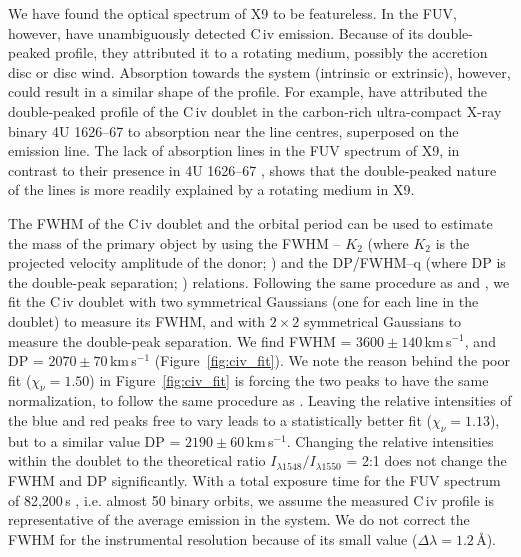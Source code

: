 \documentclass[a4paper,fleqn,usenatbib]{mnras}
\begin{document}
We have found the optical spectrum of X9 to be featureless. In the FUV, however, \citet{2008ApJ...683.1006K} have unambiguously detected C\,{\sc iv} emission. Because of its double-peaked profile, they attributed it to a rotating medium, possibly the accretion disc or disc wind. Absorption towards the system (intrinsic or extrinsic), however, could result in a similar shape of the profile. For example, \citet{2002AJ....124.3348H} have attributed the double-peaked profile of the C\,{\sc iv} doublet in the carbon-rich ultra-compact X-ray binary 4U 1626--67 to absorption near the line centres, superposed on the emission line. The lack of absorption lines in the FUV spectrum of X9, in contrast to their presence in 4U 1626--67 \citep{2002AJ....124.3348H}, shows that the double-peaked nature of the lines is more readily explained by a rotating medium in X9.

The FWHM of the C\,{\sc iv} doublet and the orbital period can be used to estimate the mass of the primary object by using the FWHM -- $K_2$ (where $K_2$ is the projected velocity amplitude of the donor; \citealp{2015ApJ...808...80C}) and the DP/FWHM--q (where DP is the double-peak separation; \citealp{2016ApJ...822...99C}) relations. Following the same procedure as \citet{2015ApJ...808...80C} and \citet{2016ApJ...822...99C}, we fit the C\,{\sc iv} doublet with two symmetrical Gaussians (one for each line in the doublet) to measure its FWHM, and with $2 \times 2$ symmetrical Gaussians to measure the double-peak separation. We find FWHM = $3600 \pm 140$\,km\,s$^{-1}$, and DP = $2070\pm70$\,km\,s$^{-1}$ (Figure~\ref{fig:civ_fit}). We note the reason behind the poor fit ($\chi_\nu = 1.50$) in Figure~\ref{fig:civ_fit} is forcing the two peaks to have the same normalization, to follow the same procedure as \citet{2016ApJ...822...99C}. Leaving the relative intensities of the blue and red peaks free to vary leads to a statistically better fit ($\chi_\nu = 1.13$), but to a similar value DP = $2190 \pm 60$\,km\,s$^{-1}$. Changing the relative intensities within the doublet to the theoretical ratio $I_{\lambda 1548} / I_{\lambda 1550}$ = 2:1 \citep{1982MNRAS.201P..39F} does not change the FWHM and DP significantly. With a total exposure time for the FUV spectrum of 82,200\,s \citep{2008ApJ...683.1006K}, i.e. almost 50 binary orbits, we assume the measured C\,{\sc iv} profile is representative of the average emission in the system. We do not correct the FWHM for the instrumental resolution because of its small value ($\Delta\lambda = 1.2$\,{\AA}). 
\end{document}
